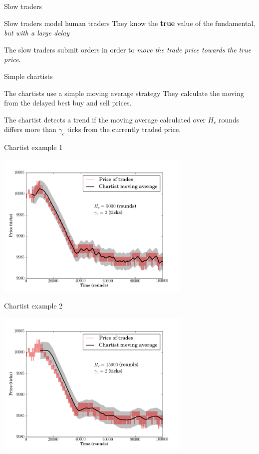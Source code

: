 \documentclass[14pt]{beamer}
\begin{document}
\begin{frame}{Slow traders}
\begin{block}{Slow traders model human traders}
They know the \textbf{true} value of the fundamental, \textit{but with a large delay}
\end{block}
The slow traders submit orders in order to \textit{move the trade price towards the true price}.
\end{frame}


\begin{frame}{Simple chartists}
\begin{block}{The chartists use a simple moving average strategy}
They calculate the moving from the delayed best buy and sell prices. 
\end{block}
The chartist detects a trend if the moving average calculated over $H_c$ rounds differs more than $\gamma_c$ ticks from the currently traded price.
\end{frame}

\begin{frame}{Chartist example 1}
\begin{center}
\includegraphics[width=0.7\textwidth]{chartist/b.png}
\end{center}
\end{frame}

\begin{frame}{Chartist example 2}
\begin{center}
\includegraphics[width=0.7\textwidth]{chartist/h.png}
\end{center}
\end{frame}
\end{document}
